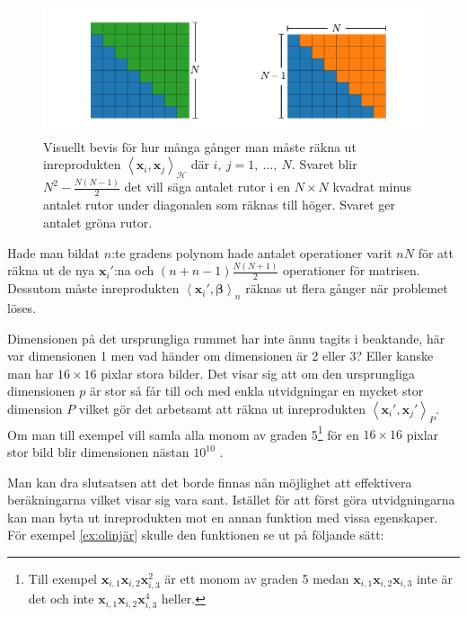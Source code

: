 \documentclass[a4paper, 12pt]{report}
\theoremstyle{definition}
\theoremstyle{remark}
\newcommand{\bfbeta}{{\boldsymbol{\beta}}}
\newcommand{\bfx}{\mathbf{x}}
\newcommand{\llangle}{\left\langle}
\newcommand{\rrangle}{\right\rangle}
\newcommand{\inner}[2]{\llangle #1, #2 \rrangle}
\newcommand{\hil}{\mathcal{H}}
\begin{document}
\begin{figure}[h]
	\centering
	\includegraphics[width=0.8\linewidth, trim={3.5cm 11mm 2.7cm 11mm}, clip]{KandFigur5.pdf}
	\caption{\label{fig:comb}Visuellt bevis för hur många gånger man måste räkna ut inreprodukten $\inner{\bfx_i}{\bfx_j}_\hil$ där $i,~j=1,~\dots,~N$. Svaret blir $N^2-\frac{N(N-1)}{2}$ det vill säga antalet rutor i en $N\times N$ kvadrat minus antalet rutor under diagonalen som räknas till höger. Svaret ger antalet gröna rutor.}
\end{figure}

Hade man bildat $n$:te gradens polynom hade antalet operationer varit $nN$ för att räkna ut de nya $\bfx_i'$:na och $(n+n-1)\frac{N(N+1)}{2}$ operationer för matrisen. Dessutom måste inreprodukten $\inner{\bfx_i'}{\bfbeta}_n$ räknas ut flera gånger när problemet löses.

Dimensionen på det ursprungliga rummet har inte ännu tagits i beaktande, här var dimensionen 1 men vad händer om dimensionen är 2 eller 3? Eller kanske man har $16\times16$ pixlar stora bilder. Det visar sig att om den ursprungliga dimensionen $p$ är stor så får till och med enkla utvidgningar en mycket stor dimension $P$ vilket gör det arbetsamt att räkna ut inreprodukten $\inner{\bfx_i'}{\bfx_j'}_P$. Om man till exempel vill samla alla monom av graden 5\footnote{Till exempel $\bfx_{i,1}\bfx_{i,2}\bfx_{i,3}^2$ är ett monom av graden 5 medan  $\bfx_{i,1}\bfx_{i,2}\bfx_{i,3}$ inte är det och inte $\bfx_{i,1}\bfx_{i,2}\bfx_{i,3}^4$ heller.} för en $16\times16$ pixlar stor bild blir dimensionen nästan $10^{10}$ \cite{LearningKernels}.

Man kan dra slutsatsen att det borde finnas nån möjlighet att effektivera beräkningarna vilket visar sig vara sant. Istället för att först göra utvidgningarna kan man byta ut inreprodukten mot en annan funktion med vissa egenskaper. För exempel \ref{ex:olinjär} skulle den funktionen se ut på följande sätt:
	
\end{document}
